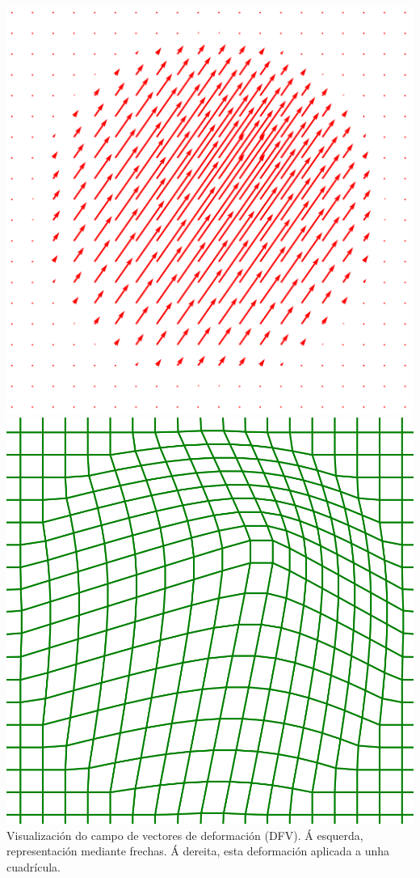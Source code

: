 \documentclass[xcolor=dvipsnames]{beamer}
\begin{document}
\begin{frame}
\begin{columns}
        \begin{column}{0.45\textwidth}
            \centering
            \includegraphics[width=\textwidth]{../imaxes/dfv_arrows.png}
            \includegraphics[width=\textwidth]{../imaxes/dfv_grid.png}  
            \small{Visualización do campo de vectores de deformación (DFV). Á esquerda, representación mediante frechas. Á dereita, esta deformación aplicada a unha cuadrícula.}
            \label{fig:dfv_visualization} 
        \end{column}


\end{columns}
\end{frame}
\end{document}
